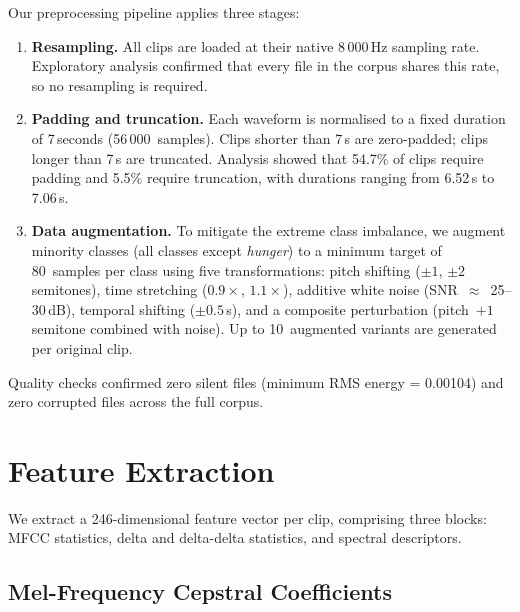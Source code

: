 \documentclass[conference]{IEEEtran}
\begin{document}
Our preprocessing pipeline applies three stages:

\begin{enumerate}
  \item \textbf{Resampling.}  All clips are loaded at their native
        8\,000\,Hz sampling rate.  Exploratory analysis confirmed that
        every file in the corpus shares this rate, so no resampling is
        required.

  \item \textbf{Padding and truncation.}  Each waveform is normalised to
        a fixed duration of 7\,seconds (56\,000~samples).  Clips shorter
        than 7\,s are zero-padded; clips longer than 7\,s are truncated.
        Analysis showed that 54.7\% of clips require padding and 5.5\%
        require truncation, with durations ranging from 6.52\,s to
        7.06\,s.

  \item \textbf{Data augmentation.}  To mitigate the extreme class
        imbalance, we augment minority classes (all classes except
        \textit{hunger}) to a minimum target of 80~samples per class
        using five transformations: pitch shifting ($\pm 1$, $\pm 2$
        semitones), time stretching ($0.9\times$, $1.1\times$), additive
        white noise (SNR~$\approx$~25--30\,dB), temporal shifting
        ($\pm 0.5$\,s), and a composite perturbation (pitch~$+1$ semitone
        combined with noise).  Up to 10~augmented variants are generated
        per original clip.
\end{enumerate}

Quality checks confirmed zero silent files (minimum RMS energy =
0.00104) and zero corrupted files across the full corpus.

\section{Feature Extraction}
\label{sec:features}

We extract a 246-dimensional feature vector per clip, comprising three
blocks: MFCC statistics, delta and delta-delta statistics, and spectral
descriptors.

\subsection{Mel-Frequency Cepstral Coefficients}
\end{document}
